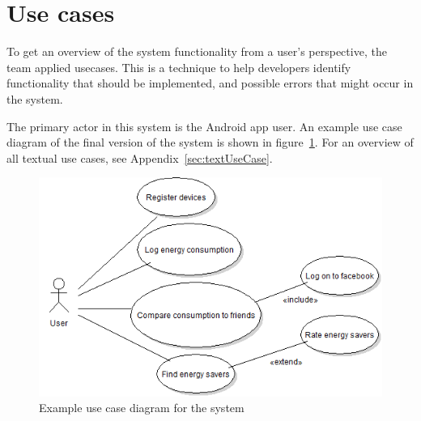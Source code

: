 \newpage
\section{Use cases}
To get an overview of the system functionality from a user's perspective, the team applied \glspl{usecase}. This is a technique to help developers identify functionality that should be implemented, and possible errors that might occur in the system.

The primary actor in this system is the Android app user. An example use case diagram of the final version of the system is shown in figure~\ref{fig:usecase}. For an overview of all textual use cases, see Appendix~\ref{sec:textUseCase}.\\

\begin{figure}[H]
\includegraphics[width=\textwidth]{ch/specification/fig/currentUsecase.png}
\caption{Example use case diagram for the system}
\label{fig:usecase}
\end{figure}
